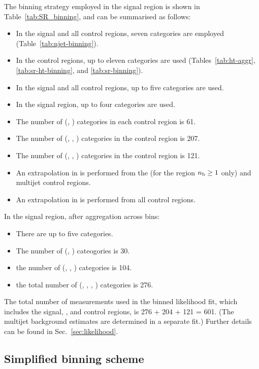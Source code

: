 The binning strategy employed in the signal region is shown in
Table~\ref{tab:SR_binning}, and can be summarised as follows:
\begin{itemize}
\item In the signal and all control regions, seven \njet categories
  are employed (Table~\ref{tab:njet-binning}). 
\item In the control regions, up to eleven \scalht categories are
  used (Tables~\ref{tab:ht-aggr}, \ref{tab:sr-ht-binning}, and
  \ref{tab:sr-binning}).  
\item In the signal and all control regions, up to five \nb categories
  are used.
\item In the signal region, up to four \HTmiss categories are used.
\item The number of (\njet, \scalht) categories in each control region
  is 61.
\item The number of (\njet, \scalht, \nb) categories in the \mj
  control region is 207.
\item The number of (\njet, \scalht, \nb) categories in the \mmj
  control region is 121.
\item An extrapolation in \nb is performed from the \mmj (for the
  region $n_{\text{b}} \geq 1$ only) and multijet control regions.
\item An extrapolation in \HTmiss is performed from all control regions.
\end{itemize}
In the signal region, after aggregation across \scalht bins: 
\begin{itemize}
\item There are up to five \scalht categories.
\item The number of (\njet, \scalht) cateogories is 30.
\item the number of (\njet, \scalht, \nb) categories is 104.
\item the total number of (\njet, \scalht, \nb, \HTmiss) categories is
  276. 
\end{itemize}

The total number of measurements used in the binned likelihood fit,
which includes the signal, \mj, and \mmj control regions, is 276 + 204
+ 121 = 601. (The multijet background estimates are determined in a
separate fit.) Further details can be found in
Sec.~\ref{sec:likelihood}. 

\subsection{Simplified binning scheme}
\label{sec:aggregated}

